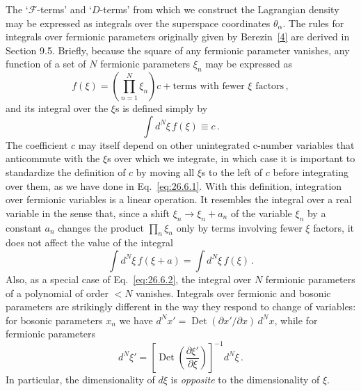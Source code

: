 The `\(\mathcal{F}\)-terms' and `\(D\)-terms' from which we construct the
Lagrangian density may be expressed as integrals over the superspace
coordinates \(\theta_\alpha\). The rules for integrals over fermionic
parameters originally given by Berezin~\hyperref[ch26-ref-4]{[4]} are derived
in Section 9.5. Briefly, because the square of any fermionic parameter
vanishes, any function of a set of \(N\) fermionic parameters \(\xi_n\) may
be expressed as
\begin{equation}
  f(\xi)
  =\left(\prod_{n=1}^{N}\xi_n\right)c
   +\text{terms with fewer \(\xi\) factors}\,,
  \tag{26.6.1}\label{eq:26.6.1}
\end{equation}
and its integral over the \(\xi\)s is defined simply by
\begin{equation}
  \int d^N\xi\,f(\xi)\equiv c\,.
  \tag{26.6.2}\label{eq:26.6.2}
\end{equation}
The coefficient \(c\) may itself depend on other unintegrated c-number
variables that anticommute with the \(\xi\)s over which we integrate, in which
case it is important to standardize the definition of \(c\) by moving all
\(\xi\)s to the left of \(c\) before integrating over them, as we have done
in Eq.~\eqref{eq:26.6.1}. With this definition, integration over fermionic
variables is a linear operation. It resembles the integral over a real
variable in the sense that, since a shift \(\xi_n\longrightarrow\xi_n+a_n\)
of the variable \(\xi_n\) by a constant \(a_n\) changes the product
\(\prod_n\xi_n\) only by terms involving fewer \(\xi\) factors, it does not
affect the value of the integral
\begin{equation}
  \int d^N\xi\,f(\xi+a)=\int d^N\xi\,f(\xi)\,.
  \tag{26.6.3}\label{eq:26.6.3}
\end{equation}
Also, as a special case of Eq.~\eqref{eq:26.6.2}, the integral over \(N\)
fermionic parameters of a polynomial of order \(<N\) vanishes. Integrals over
fermionic and bosonic parameters are strikingly different in the way they
respond to change of variables: for bosonic parameters \(x_n\) we have
\(d^Nx'=\operatorname{Det}(\partial x'/\partial x)\,d^Nx\), while for
fermionic parameters
\begin{equation}
  d^N\xi'
  =\left[\operatorname{Det}
    \left(\frac{\partial\xi'}{\partial\xi}\right)\right]^{-1}d^N\xi\,.
  \tag{26.6.4}\label{eq:26.6.4}
\end{equation}
In particular, the dimensionality of \(d\xi\) is \emph{opposite} to the
dimensionality of \(\xi\).

